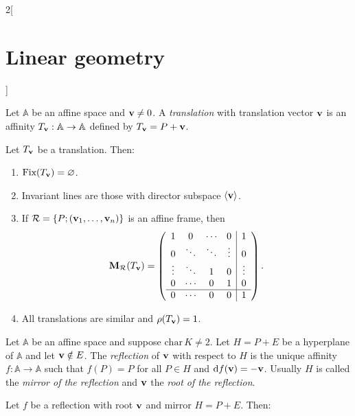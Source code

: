 \documentclass[../../../main.tex]{subfiles}
\begin{document}
\begin{multicols}{2}[\section{Linear geometry}]
\begin{definition}
  \end{definition}
  \begin{definition}[Translations]
    Let $\mathbb{A}$ be an affine space and $\boldsymbol{\mathrm{v}}\ne 0$. A \emph{translation} with translation vector $\boldsymbol{\mathrm{v}}$ is an affinity $T_{\boldsymbol{\mathrm{v}}}:\mathbb{A}\rightarrow\mathbb{A}$ defined by $T_{\boldsymbol{\mathrm{v}}}=P+\boldsymbol{\mathrm{v}}$.
  \end{definition}
  \begin{proposition}
    Let $T_{\boldsymbol{\mathrm{v}}}$ be a translation. Then:
    \begin{enumerate}
      \item $\text{Fix}(T_{\boldsymbol{\mathrm{v}}})=\varnothing$.
      \item Invariant lines are those with director subspace $\langle\boldsymbol{\mathrm{v}}\rangle$.
      \item If $\mathcal{R}=\{P;(\boldsymbol{\mathrm{v}}_1,\ldots,\boldsymbol{\mathrm{v}}_n)\}$ is an affine frame, then $$\boldsymbol{\mathrm{M}}_\mathcal{R}(T_{\boldsymbol{\mathrm{v}}})=\left(\begin{array}{cccc|c}
                  1      & 0      & \cdots & 0      & 1      \\
                  0      & \ddots & \ddots & \vdots & 0      \\
                  \vdots & \ddots & 1      & 0      & \vdots \\
                  0      & \cdots & 0      & 1      & 0      \\
                  \hline
                  0      & \cdots & 0      & 0      & 1
                \end{array}\right).$$
      \item All translations are similar and $\rho(T_{\boldsymbol{\mathrm{v}}})=1$.
    \end{enumerate}
  \end{proposition}
  \begin{definition}[Reflections]
    Let $\mathbb{A}$ be an affine space and suppose $\text{char}\,K\ne 2$. Let $H=P+E$ be a hyperplane of $\mathbb{A}$ and let $\boldsymbol{\mathrm{v}}\notin E$. The \emph{reflection} of $\boldsymbol{\mathrm{v}}$ with respect to $H$ is the unique affinity $f:\mathbb{A}\rightarrow\mathbb{A}$ such that $f(P)=P$ for all $P\in H$ and $\dd{f(\boldsymbol{\mathrm{v}})}=-\boldsymbol{\mathrm{v}}$. Usually $H$ is called the \emph{mirror of the reflection} and $\boldsymbol{\mathrm{v}}$ the \emph{root of the reflection}.
  \end{definition}
  \begin{proposition}
    Let $f$ be a reflection with root $\boldsymbol{\mathrm{v}}$ and mirror $H=P+E$. Then:
    \begin{enumerate}

\end{enumerate}
\end{proposition}
\end{multicols}
\end{document}
